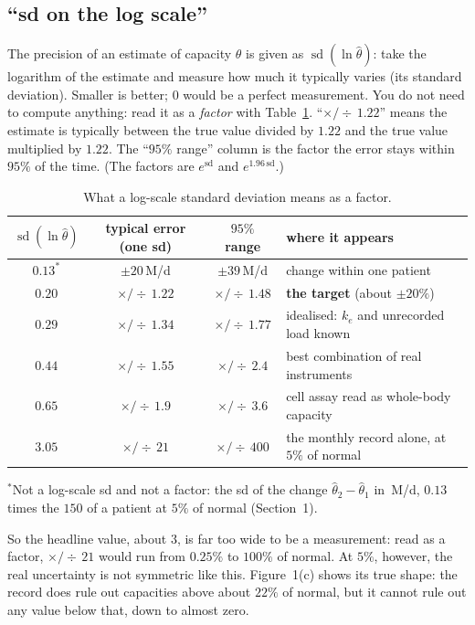 \documentclass[11pt,a4paper]{article}
\newcommand{\um}{\,\textmu M/d}
\newcommand{\sdl}[1]{\operatorname{sd}(\ln #1)}
\begin{document}
\subsection{``sd on the log scale''} The precision of an estimate of capacity $\theta$ is given
as $\sdl{\hat\theta}$: take the logarithm of the estimate and measure how much it typically
varies (its standard deviation). Smaller is better; $0$ would be a perfect measurement. You do
not need to compute anything: read it as a \emph{factor} with Table~\ref{tab:sd}.
``$\times/\div\,1.22$'' means the estimate is typically between the true value divided by
$1.22$ and the true value multiplied by $1.22$. The ``$95\%$ range'' column is the factor the
error stays within $95\%$ of the time. (The factors are $e^{\mathrm{sd}}$ and
$e^{1.96\,\mathrm{sd}}$.)

\begin{table}[h]
\centering\small
\caption{\label{tab:sd}What a log-scale standard deviation means as a factor.}
\begin{tabular}{@{}ccc l@{}}
\toprule
$\sdl{\hat\theta}$ & typical error (one sd) & $95\%$ range & where it appears \\
\midrule
$0.13^{*}$ & $\pm20$\um & $\pm39$\um & change within one patient \\
$0.20$ & $\times/\div\,1.22$ & $\times/\div\,1.48$ & \textbf{the target} (about $\pm20\%$) \\
$0.29$ & $\times/\div\,1.34$ & $\times/\div\,1.77$ & idealised: $k_e$ and unrecorded load known \\
$0.44$ & $\times/\div\,1.55$ & $\times/\div\,2.4$ & best combination of real instruments \\
$0.65$ & $\times/\div\,1.9$ & $\times/\div\,3.6$ & cell assay read as whole-body capacity \\
$3.05$ & $\times/\div\,21$ & $\times/\div\,400$ & the monthly record alone, at $5\%$ of normal \\
\bottomrule
\end{tabular}
\par\smallskip\footnotesize ${}^{*}$Not a log-scale sd and not a factor: the sd of the change
$\hat\theta_2-\hat\theta_1$ in \um, $0.13$ times the $150$ of a patient at $5\%$ of normal (Section~1).

\end{table}

\noindent So the headline value, about $3$, is far too wide to be a measurement: read as a
factor, $\times/\div\,21$ would run from $0.25\%$ to $100\%$ of normal. At $5\%$, however, the
real uncertainty is not symmetric like this. Figure~1(c) shows its true shape: the record does
rule out capacities above about $22\%$ of normal, but it cannot rule out any value below that,
down to almost zero.
\end{document}
